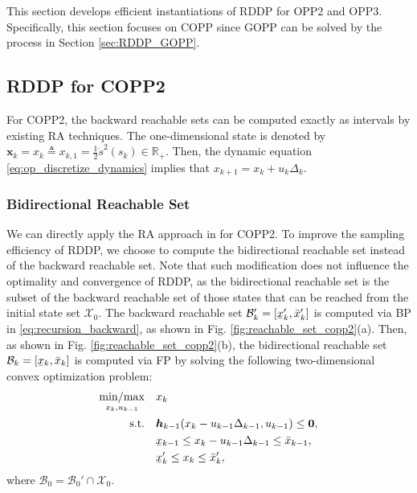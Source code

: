 \documentclass[journal]{IEEEtran}
\theoremstyle{definition}
\theoremstyle{definition}
\newcommand\R{{\mathbb{R}}}
\newcommand\st{{\text{s.t.}}}
\renewcommand\vector[1]{\boldsymbol{#1}}
\newcommand\vh{{\vector{h}}}
\newcommand\vx{{\vector{x}}}
\newcommand\vzero{{\vector{0}}}
\DeclareMathOperator*{\minmax}{min/max}
\DeclareRobustCommand{\underbar}[1]{\kern0.3\fontdimen2\font\underaccent{\bar}{\kern-0.3\fontdimen2\font #1}}
\begin{document}
This section develops efficient instantiations of RDDP for OPP2 and OPP3. Specifically, this section focuses on COPP since GOPP can be solved by the process in Section \ref{sec:RDDP_GOPP}.

\subsection{RDDP for COPP2}\label{subsec:ardp_copp2}

For COPP2, the backward reachable sets can be computed exactly as intervals by existing RA techniques. The one-dimensional state is denoted by $\vx_k=x_k\triangleq x_{k,1}=\frac12\dot{s}^2(s_k)\in\R_+$. Then, the dynamic equation \eqref{eq:op_discretize_dynamics} implies that $x_{k+1}=x_k+u_k\Delta_k$.

\subsubsection{Bidirectional Reachable Set}\label{sub2sec:ardp_opp2_reachable_set}
We can directly apply the RA approach in \cite{pham2018new} for COPP2. To improve the sampling efficiency of RDDP, we choose to compute the bidirectional reachable set instead of the backward reachable set. Note that such modification does not influence the optimality and convergence of RDDP, as the bidirectional reachable set is the subset of the backward reachable set of those states that can be reached from the initial state set $\mathcal{X}_0$. The backward reachable set $\mathcal{B}_{k}'=[\underbar{x}_{k}',\bar{x}_{k}']$ is computed via BP in \eqref{eq:recursion_backward}, as shown in Fig. \ref{fig:reachable_set_copp2}(a). Then, as shown in Fig. \ref{fig:reachable_set_copp2}(b), the bidirectional reachable set $\mathcal{B}_k=[\underbar{x}_k,\bar{x}_k]$ is computed via FP by solving the following two-dimensional convex optimization problem:
\begin{subequations}
    \begin{align}
        \minmax_{x_k,u_{k-1}}\quad&x_k\\
        \st\quad&\vh_{k-1}(x_k-u_{k-1}\Delta_{k-1},u_{k-1})\leq\vzero,\\
        &\underbar{x}_{k-1}\leq x_k-u_{k-1}\Delta_{k-1}\leq \bar{x}_{k-1},\\
        &\underbar{x}_k'\leq x_k\leq \bar{x}_k',
    \end{align}
\end{subequations}
where $\mathcal{B}_{0}=\mathcal{B}_{0}'\cap\mathcal{X}_0$.
\end{document}
